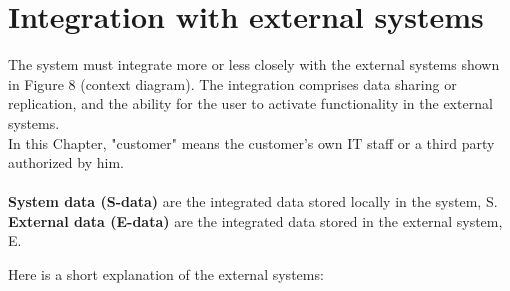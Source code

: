\documentclass[Main]{subfiles}
\begin{document}
\chapter{Integration with external systems}\label{cha:F}

The system must integrate more or less closely with the external systems shown in Figure 8 (context diagram). The integration comprises data sharing or replication, and the ability for the user to activate functionality in the external systems. 
\\
In this Chapter, "customer" means the customer's own IT staff or a third party authorized by him.
\\
\\
\textbf{System data (S-data)} are the integrated data stored locally in the system, S.\\
\textbf{External data (E-data)} are the integrated data stored in the external system, E.

Here is a short explanation of the external systems:






\end{document}

